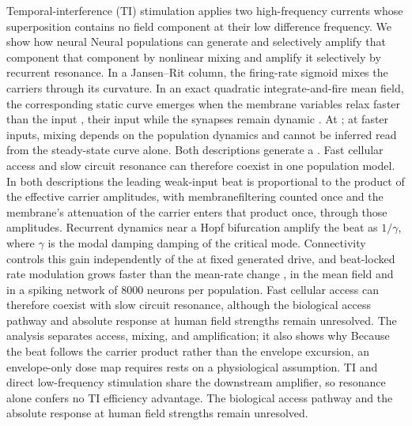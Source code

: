 \documentclass[11pt,a4paper]{article}
\providecommand{\DIFaddtex}[1]{{\protect\color{blue} \sf #1}} %
\providecommand{\DIFdeltex}[1]{{\protect\color{red} \scriptsize #1}} %
\providecommand{\DIFaddbegin}{} %
\providecommand{\DIFaddend}{} %
\providecommand{\DIFdelbegin}{} %
\providecommand{\DIFdelend}{} %
\providecommand{\DIFadd}[1]{\texorpdfstring{\DIFaddtex{#1}}{#1}} %
\providecommand{\DIFdel}[1]{\texorpdfstring{\DIFdeltex{#1}}{}} %
\begin{document}
\else
\noindent
Temporal-interference (TI) stimulation applies two high-frequency currents whose
superposition contains no field component at their low difference frequency. \DIFdelbegin \DIFdel{We show
how neural }\DIFdelend \DIFaddbegin \DIFadd{Neural
}\DIFaddend populations can generate \DIFdelbegin \DIFdel{and selectively amplify that component }\DIFdelend \DIFaddbegin \DIFadd{that component by nonlinear mixing and amplify it selectively
by recurrent resonance}\DIFaddend . In a Jansen--Rit column, the firing-rate sigmoid mixes the
carriers through its curvature. In an exact quadratic integrate-and-fire mean field, the
corresponding static curve emerges when the membrane variables relax faster than \DIFdelbegin \DIFdel{the input , }\DIFdelend \DIFaddbegin \DIFadd{their
input }\DIFaddend while the synapses remain dynamic\DIFdelbegin \DIFdel{. At }\DIFdelend \DIFaddbegin \DIFadd{; at }\DIFaddend faster inputs, mixing depends on the
population dynamics and cannot be \DIFdelbegin \DIFdel{inferred }\DIFdelend \DIFaddbegin \DIFadd{read }\DIFaddend from the steady-state curve\DIFdelbegin \DIFdel{alone. Both descriptions generate a
}\DIFdelend \DIFaddbegin \DIFadd{. Fast cellular access
and slow circuit resonance can therefore coexist in one population model. In both
descriptions the }\DIFaddend leading weak-input beat \DIFaddbegin \DIFadd{is }\DIFaddend proportional to the product of the effective
carrier amplitudes, \DIFdelbegin \DIFdel{with membranefiltering counted once}\DIFdelend \DIFaddbegin \DIFadd{and the membrane's attenuation of the carrier enters that product
once, through those amplitudes}\DIFaddend . Recurrent dynamics near a Hopf bifurcation amplify the
beat as $1/\gamma$, where $\gamma$ is the \DIFdelbegin \DIFdel{modal damping }\DIFdelend \DIFaddbegin \DIFadd{damping of the critical mode}\DIFaddend . Connectivity
controls this gain \DIFdelbegin \DIFdel{independently of the }\DIFdelend \DIFaddbegin \DIFadd{at fixed }\DIFaddend generated drive, and beat-locked rate modulation grows
faster than the mean-rate change\DIFaddbegin \DIFadd{, }\DIFaddend in the mean field and in a spiking network of $8000$
neurons per population. \DIFdelbegin \DIFdel{Fast cellular access can therefore coexist
with slow circuit resonance, although the biological access pathway and absolute
response at human field strengths remain unresolved. The analysis separates access, mixing, and amplification; it also shows why }\DIFdelend \DIFaddbegin \DIFadd{Because the beat follows the carrier product rather than the
envelope excursion, }\DIFaddend an envelope-only dose map \DIFdelbegin \DIFdel{requires }\DIFdelend \DIFaddbegin \DIFadd{rests on }\DIFaddend a physiological assumption. TI
and direct low-frequency stimulation share the downstream amplifier, so resonance alone
confers no TI efficiency advantage. \DIFaddbegin \DIFadd{The biological access pathway and the absolute
response at human field strengths remain unresolved.
}\DIFaddend \fi
\end{document}
